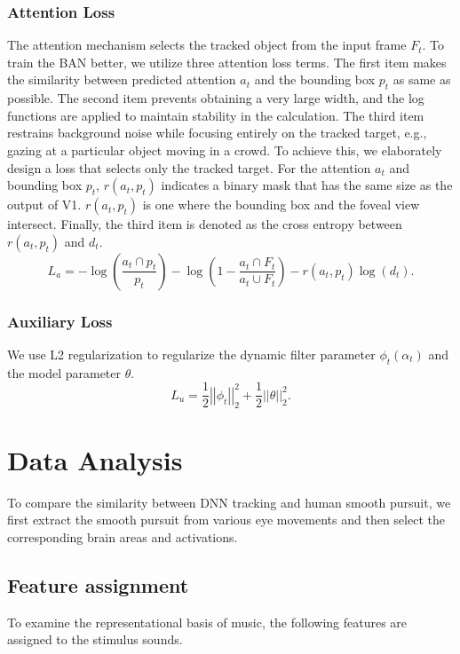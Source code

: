 \documentclass[journal]{IEEEtran}
\begin{document}
\subsubsection{Attention Loss}
The attention mechanism selects the tracked object from the input frame $F_t$.
To train the BAN better, we utilize three attention loss terms.
The first item makes the similarity between predicted attention $a_t$ and the bounding box $p_t$ as same as possible. 
The second item prevents obtaining a very large width, and the log functions are applied to maintain stability in the calculation. 
The third item restrains background noise while focusing entirely on the tracked target, e.g., gazing at a particular object moving in a crowd. 
To achieve this, we elaborately design a loss that selects only the tracked target.
For the attention $a_t$ and bounding box $p_t$, $r(a_t, p_t)$ indicates a binary mask that has the same size as the output of V1. 
$r(a_t, p_t)$ is one where the bounding box and the foveal view intersect.
Finally, the third item is denoted as the cross entropy between $r(a_t, p_t)$ and $d_t$.
\begin{equation}
	L_a = -\log (\frac{a_t \cap p_t}{p_t}) - \log (1 - \frac{a_t \cap F_t}{a_t \cup F_t})
	- r(a_t, p_t) \log(d_t).
\end{equation}

\subsubsection{Auxiliary Loss}
We use L2 regularization to regularize the dynamic filter parameter $\phi_t(\alpha_t)$ and the model parameter $\theta$.
\begin{equation}
	L_u = \frac{1}{2} \left\vert \left\vert \phi_t \right\vert \right\vert _2 ^2 
	+ \frac{1}{2} \left\vert \left\vert \theta \right\vert \right\vert _2 ^2.
\end{equation}


\section{Data Analysis} \label{sec:data_analysis}
To compare the similarity between DNN tracking and human smooth pursuit, we first extract the smooth pursuit from various eye movements 
and then select the corresponding brain areas and activations. 


\subsection{Feature assignment}
To examine the representational basis of music, the following features are assigned to the stimulus sounds.
\end{document}
